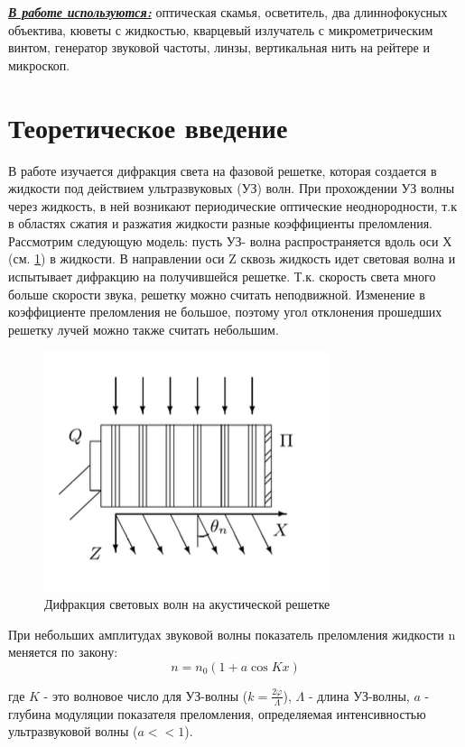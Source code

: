 \documentclass[a4paper,12pt]{article} %
\renewcommand{\phi}{\ensuremath{\varphi}} %
\theoremstyle{plain} %
\theoremstyle{definition} %
\theoremstyle{remark} %
\renewcommand{\phi}{\ensuremath{\varphi}}
\begin{document}
\noindent \underline{\textbf{\textit{В работе используются:}}} оптическая скамья, осветитель, два длиннофокусных объектива, кюветы с жидкостью, кварцевый излучатель с микрометрическим винтом, генератор звуковой частоты, линзы, вертикальная нить на рейтере и микроскоп.


\section{Теоретическое введение}

	В работе изучается дифракция света на фазовой решетке, которая создается в жидкости под действием ультразвуковых (УЗ) волн. При прохождении УЗ волны через жидкость, в ней возникают периодические оптические неоднородности, т.к в областях сжатия и разжатия жидкости разные коэффициенты преломления. 
	Рассмотрим следующую модель: пусть УЗ- волна распространяется вдоль оси Х (см. \ref{diff}) в жидкости. В направлении оси Z сквозь жидкость идет световая волна и испытывает дифракцию на получившейся решетке. 
	Т.к. скорость света много больше скорости звука, решетку можно считать неподвижной. Изменение в коэффициенте преломления не большое, поэтому угол отклонения прошедших решетку лучей можно также считать небольшим.
	
\begin{figure}[H]
	\centering
	\includegraphics[scale=1.5]{1.png}
	\caption{Дифракция световых волн на акустической решетке}
	\label{diff}
\end{figure}	
	
	
	
При небольших амплитудах звуковой волны показатель преломления жидкости n меняется по закону:
\begin{equation}
	n = n_0 (1 + a \cos K x)
\end{equation}
	
где $K$ - это волновое число для УЗ-волны ($k=\frac{2\phi}{\Lambda}$), $\Lambda$ - длина УЗ-волны, $a$ - глубина модуляции показателя преломления, определяемая интенсивностью ультразвуковой волны ($a<<1$).
\end{document}

